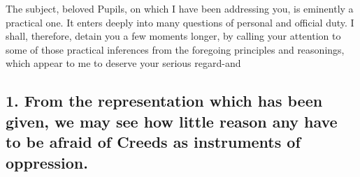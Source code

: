 \documentclass[
]{book}
\begin{document}
The subject, beloved Pupils, on which I have been addressing you, is eminently a practical one. It enters deeply into many questions of personal and official duty. I shall, therefore, detain you a few moments longer, by calling your attention to some of those practical inferences from the foregoing principles and reasonings, which appear to me to deserve your serious regard-and

\hypertarget{from-the-representation-which-has-been-given-we-may-see-how-little-reason-any-have-to-be-afraid-of-creeds-as-instruments-of-oppression.}{%
\subsection{1. From the representation which has been given, we may see how little reason any have to be afraid of Creeds as instruments of oppression.}\label{from-the-representation-which-has-been-given-we-may-see-how-little-reason-any-have-to-be-afraid-of-creeds-as-instruments-of-oppression.}}
\end{document}
